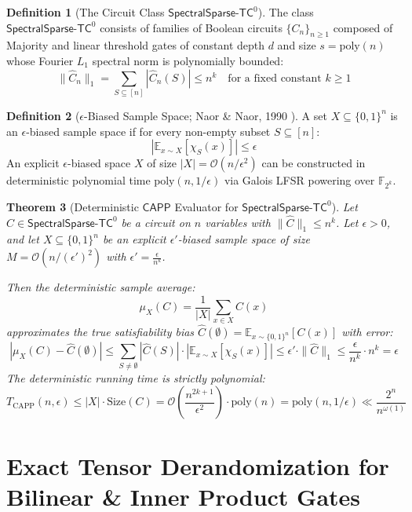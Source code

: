 \documentclass[11pt,a4paper]{article}
\newtheorem{theorem}{Theorem}[section]
\theoremstyle{definition}
\newtheorem{definition}[theorem]{Definition}
\theoremstyle{remark}
\newcommand{\poly}{\mathrm{poly}}
\newcommand{\CAPP}{\mathsf{CAPP}}
\newcommand{\E}{\mathbb{E}}
\newcommand{\SparseTC}{\mathsf{SpectralSparse}\text{-}\mathsf{TC}^0}
\begin{document}
\begin{definition}[The Circuit Class $\SparseTC$]
The class $\SparseTC$ consists of families of Boolean circuits $\{C_n\}_{n \ge 1}$ composed of Majority and linear threshold gates of constant depth $d$ and size $s = \poly(n)$ whose Fourier $L_1$ spectral norm is polynomially bounded:
\[
\| \hat{C}_n \|_1 = \sum_{S \subseteq [n]} |\hat{C}_n(S)| \le n^k \quad \text{for a fixed constant } k \ge 1
\]
\end{definition}

\begin{definition}[$\epsilon$-Biased Sample Space; Naor \& Naor, 1990 \cite{naor90}]
A set $X \subseteq \{0,1\}^n$ is an $\epsilon$-biased sample space if for every non-empty subset $S \subseteq [n]$:
\[
\left| \E_{x \sim X} [\chi_S(x)] \right| \le \epsilon
\]
An explicit $\epsilon$-biased space $X$ of size $|X| = \mathcal{O}(n / \epsilon^2)$ can be constructed in deterministic polynomial time $\poly(n, 1/\epsilon)$ via Galois LFSR powering over $\mathbb{F}_{2^k}$.
\end{definition}

\begin{theorem}[Deterministic $\CAPP$ Evaluator for $\SparseTC$]\label{thm:deterministic_capp}
Let $C \in \SparseTC$ be a circuit on $n$ variables with $\| \hat{C} \|_1 \le n^k$. Let $\epsilon > 0$, and let $X \subseteq \{0,1\}^n$ be an explicit $\epsilon'$-biased sample space of size $M = \mathcal{O}(n / (\epsilon')^2)$ with $\epsilon' = \frac{\epsilon}{n^k}$.

Then the deterministic sample average:
\[
\mu_X(C) = \frac{1}{|X|} \sum_{x \in X} C(x)
\]
approximates the true satisfiability bias $\hat{C}(\emptyset) = \E_{x \sim \{0,1\}^n}[C(x)]$ with error:
\[
\left| \mu_X(C) - \hat{C}(\emptyset) \right| \le \sum_{S \neq \emptyset} |\hat{C}(S)| \cdot \left| \E_{x \sim X}[\chi_S(x)] \right| \le \epsilon' \cdot \| \hat{C} \|_1 \le \frac{\epsilon}{n^k} \cdot n^k = \epsilon
\]
The deterministic running time is strictly polynomial:
\[
T_{\mathrm{CAPP}}(n, \epsilon) \le |X| \cdot \mathrm{Size}(C) = \mathcal{O}\left( \frac{n^{2k+1}}{\epsilon^2} \right) \cdot \poly(n) = \poly(n, 1/\epsilon) \ll \frac{2^n}{n^{\omega(1)}}
\]
\end{theorem}

\section{Exact Tensor Derandomization for Bilinear & Inner Product Gates}
\end{document}
